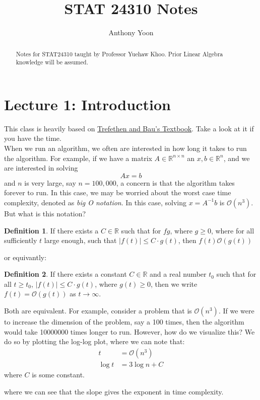 \documentclass[11pt]{article}
\title{STAT 24310 Notes}
\author{Anthony Yoon}
\theoremstyle{definition}
\newtheorem{definition}{Definition}[section]
\newcommand{\R}{\mathbb{R}}
\begin{document}
\maketitle
\tableofcontents
\begin{abstract}
  Notes for STAT24310 taught by Professor Yuehaw Khoo. Prior Linear Algebra knowledge will be assumed. 
\end{abstract}
\newpage
\section{Lecture 1: Introduction}
This class is heavily based on \href{https://www.stat.uchicago.edu/~lekheng/courses/309/books/Trefethen-Bau.pdf}{Trefethen and Bau's Textbook}. Take a look at it if you have the time. \\
When we run an algorithm, we often are interested in how long it takes to run the algorithm. For example, if we have a matrix $A \in \R^{n \times n}$ an $x, b \in \R^n$, and we are interested in solving 
\[
Ax = b
\]
and $n$ is very large, say $ n = 100,000$, a concern is that the algorithm takes forever to run. In this case, we may be worried about the worst case time complexity, denoted as \emph{big O notation}. In this case, solving $x = A^{-1} b$ is $\mathcal{O}(n^3)$. But what is this notation? 
\begin{definition}
  If there exists a $C \in \R$ such that for $f g$, where $g \geq 0$, where for all sufficiently $t$ large enough, such that $|f(t)| \leq C \cdot g(t)$, then $f(t) \mathcal{O}(g(t))$ 
\end{definition}
or equivantly:
\begin{definition}
  If there exists a constant \( C \in \mathbb{R} \) and a real number \( t_0 \) such that for all \( t \geq t_0 \), \( |f(t)| \leq C \cdot g(t) \), where \( g(t) \geq 0 \), then we write \( f(t) = \mathcal{O}(g(t)) \) as \( t \to \infty \).
\end{definition}
Both are equivalent. For example, consider a problem that is $\mathcal{O}(n^3)$. If we were to increase the dimension of the problem, say a 100 times, then the algorithm would take 10000000 times longer to run. However, how do we visualize this? We do so by plotting the log-log plot, where we can note that:
\begin{align*}
  t &= \mathcal{O}(n^3)\\
  \log t &= 3 \log n + C
\end{align*}
where $C$ is some constant. 
\begin{center}

\end{center}
where we can see that the slope gives the exponent in time complexity. 
\end{document}
